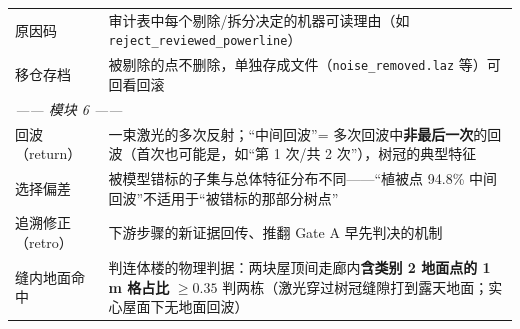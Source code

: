 \begin{center}
\begin{tabular}{p{3.4cm}p{11.2cm}}
原因码 & 审计表中每个剔除/拆分决定的机器可读理由（如 \texttt{reject\_reviewed\_powerline}） \\
移仓存档 & 被剔除的点不删除，单独存成文件（\texttt{noise\_removed.laz} 等）可回看回滚 \\
\multicolumn{2}{l}{\emph{—— 模块 6 ——}} \\
回波（return） & 一束激光的多次反射；``中间回波''= 多次回波中\textbf{非最后一次}的回波（首次也可能是，如``第 1 次/共 2 次''），树冠的典型特征 \\
选择偏差 & 被模型错标的子集与总体特征分布不同——``植被点 94.8\% 中间回波''不适用于``被错标的那部分树点'' \\
追溯修正（retro） & 下游步骤的新证据回传、推翻 Gate A 早先判决的机制 \\
缝内地面命中 & 判连体楼的物理判据：两块屋顶间走廊内\textbf{含类别 2 地面点的 1 m 格占比} $\geq0.35$ 判两栋（激光穿过树冠缝隙打到露天地面；实心屋面下无地面回波） \\
\bottomrule
\end{tabular}
\end{center}
